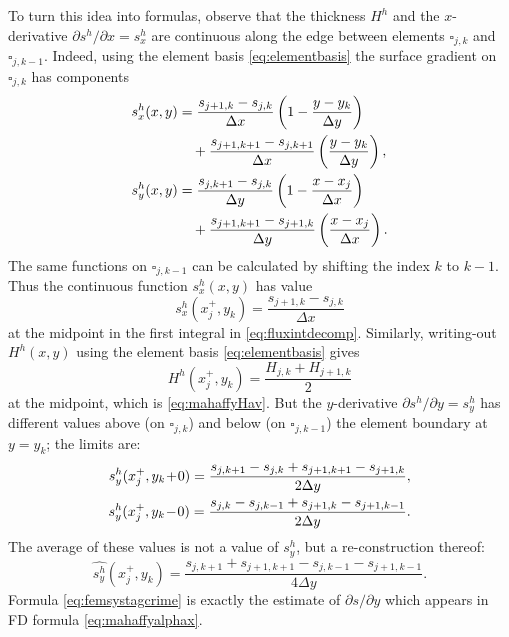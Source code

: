 \documentclass[twocolumn,letterpaper]{igs}
\begin{document}
To turn this idea into formulas, observe that the thickness $H^h$ and the $x$-derivative $\partial s^h/\partial x = s^h_x$ are continuous along the edge between elements $\square_{j,k}$ and $\square_{j,k-1}$.  Indeed, using the element basis \eqref{eq:elementbasis} the surface gradient on $\square_{j,k}$ has components
\begin{align}
s^h_x(x,y) &= \frac{s_{j+1,k}-s_{j,k}}{\Delta x} \left(1-\frac{y-y_k}{\Delta y}\right)  \label{eq:grads} \\
   &\quad + \frac{s_{j+1,k+1}-s_{j,k+1}}{\Delta x} \left(\frac{y-y_k}{\Delta y}\right), \notag \\
s^h_y(x,y) &= \frac{s_{j,k+1}-s_{j,k}}{\Delta y} \left(1-\frac{x-x_j}{\Delta x}\right) \notag \\
   &\quad + \frac{s_{j+1,k+1}-s_{j+1,k}}{\Delta y} \left(\frac{x-x_j}{\Delta x}\right). \notag
\end{align}
The same functions on $\square_{j,k-1}$ can be calculated by shifting the index $k$ to $k-1$.  Thus the continuous function $s^h_x(x,y)$ has value
\begin{equation}
s^h_x(x_j^+,y_k) = \frac{s_{j+1,k}-s_{j,k}}{\Delta x} \label{eq:femsxstag}
\end{equation}
at the midpoint in the first integral in \eqref{eq:fluxintdecomp}.  Similarly, writing-out $H^h(x,y)$ using the element basis \eqref{eq:elementbasis} gives
\begin{equation}
H^h(x_j^+,y_k) = \frac{H_{j,k}+H_{j+1,k}}{2} \label{eq:femHstag}
\end{equation}
at the midpoint, which is \eqref{eq:mahaffyHav}.  But the $y$-derivative $\partial s^h/\partial y = s^h_y$ has different values above (on $\square_{j,k}$) and below (on $\square_{j,k-1}$) the element boundary at $y = y_k$; the limits are:
\begin{align}
s^h_y(x_j^+,y_k\!+\!0) = \frac{s_{j,k+1}-s_{j,k} + s_{j+1,k+1}-s_{j+1,k}}{2\Delta y}, \\
s^h_y(x_j^+,y_k\!-\!0) = \frac{s_{j,k}-s_{j,k-1} + s_{j+1,k}-s_{j+1,k-1}}{2\Delta y}. \notag
\end{align}
The average of these values is not a value of $s_y^h$, but a re-construction thereof:
\begin{equation}
\widehat{s^h_y}(x_j^+,y_k) = \frac{s_{j,k+1} + s_{j+1,k+1} - s_{j,k-1} - s_{j+1,k-1}}{4\Delta y}. \label{eq:femsystagcrime}
\end{equation}
Formula \eqref{eq:femsystagcrime} is exactly the estimate of $\partial s/\partial y$ which appears in FD formula \eqref{eq:mahaffyalphax}.
\end{document}
